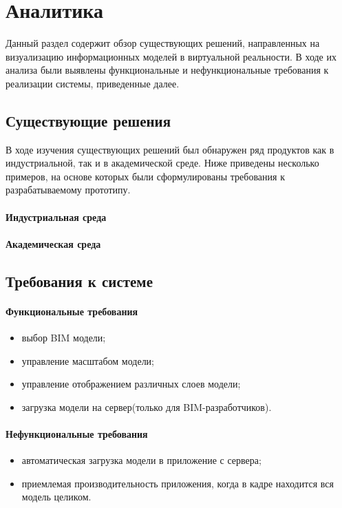 ﻿\section{Аналитика}

Данный раздел содержит обзор существующих решений,
направленных на визуализацию информационных моделей в виртуальной реальности.
В ходе их анализа были выявлены функциональные и нефункциональные требования
к реализации системы, приведенные далее. 

\subsection{Существующие решения}
В ходе изучения существующих решений был обнаружен ряд продуктов
как в индустриальной, так и в академической среде.
Ниже приведены несколько примеров,
на основе которых были сформулированы требования к разрабатываемому прототипу.

\paragraph{Индустриальная среда}

\lipsum[2][1-3]
\cite{UnityReflect}

\lipsum[4][1-4]
\cite{IrisVR}

\lipsum[3][1-4]
\cite{Enscape}

\paragraph{Академическая среда}

\lipsum[5][1-4]
\cite{Davidson2019}

\lipsum[6][1-4]
\cite{Sampaio2018}

\lipsum[7][1-8]
\cite{PourRahimian2019}


\subsection{Требования к системе}
\paragraph{Функциональные требования}
\begin{itemize}
    \item выбор BIM модели;
    \item управление масштабом модели;
    \item управление отображением различных слоев модели;
    \item загрузка модели на сервер(только для BIM-разработчиков).
\end{itemize}

\paragraph{Нефункциональные требования}
\begin{itemize}
    \item автоматическая загрузка модели в приложение с сервера;
    \item приемлемая производительность приложения, когда в кадре находится вся модель целиком.
\end{itemize}